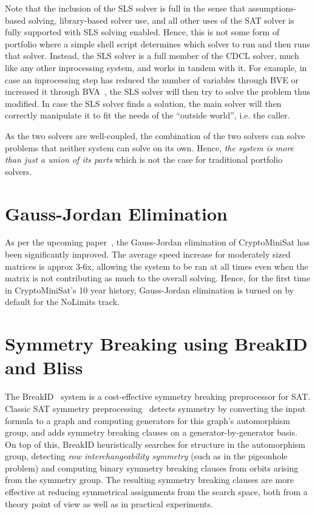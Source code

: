 \documentclass[final]{ieee}
\begin{document}
Note that the inclusion of the SLS solver is full in the sense that assumptions-based solving, library-based solver use, and all other uses of the SAT solver is fully supported with SLS solving enabled. Hence, this is not some form of portfolio where a simple shell script determines which solver to run and then runs that solver. Instead, the SLS solver is a full member of the CDCL solver, much like any other inprocessing system, and works in tandem with it. For example, in case an inprocessing step has reduced the number of variables through BVE or increased it through BVA~\cite{BVA}, the SLS solver will then try to solve the problem thus modified. In case the SLS solver finds a solution, the main solver will then correctly manipulate it to fit the needs of the ``outside world'', i.e. the caller.

As the two solvers are well-coupled, the combination of the two solvers can solve problems that neither system can solve on its own. Hence, \emph{the system is more than just a union of its parts} which is not the case for traditional portfolio solvers.

\section{Gauss-Jordan Elimination}
As per the upcoming paper~\cite{birdtwo}, the Gauss-Jordan elimination of CryptoMiniSat has been significantly improved. The average speed increase for moderately sized matrices is approx 3-6x, allowing the system to be ran at all times even when the matrix is not contributing as much to the overall solving. Hence, for the first time in CryptoMiniSat's 10 year history, Gauss-Jordan elimination is turned on by default for the NoLimits track.


\section{Symmetry Breaking using BreakID and Bliss}
The BreakID~\cite{breakid2016} system is a cost-effective symmetry breaking preprocessor for SAT.
Classic SAT symmetry preprocessing~\cite{shatter2006} detects symmetry by converting the input formula to a graph and computing generators for this graph's automorphism group, and adds symmetry breaking clauses on a generator-by-generator basis.
On top of this, BreakID heuristically searches for structure in the automorphism group, detecting \emph{row interchangeability symmetry} (such as in the pigeonhole problem) and computing binary symmetry breaking clauses from orbits arising from the symmetry group.
The resulting symmetry breaking clauses are more effective at reducing symmetrical assignments from the search space, both from a theory point of view as well as in practical experiments.
\end{document}
